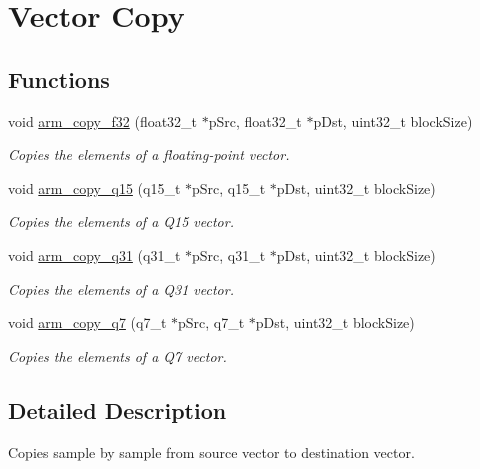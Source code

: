\hypertarget{group__copy}{\section{Vector Copy}
\label{group__copy}
}
\subsection*{Functions}
\begin{DoxyCompactItemize}
\item 
void \hyperlink{group__copy_gadd1f737e677e0e6ca31767c7001417b3}{arm\-\_\-copy\-\_\-f32} (float32\-\_\-t $\ast$p\-Src, float32\-\_\-t $\ast$p\-Dst, uint32\-\_\-t block\-Size)
\begin{DoxyCompactList}\small\item\em Copies the elements of a floating-\/point vector. \end{DoxyCompactList}\item 
void \hyperlink{group__copy_ga872ca4cfc18c680b8991ccd569a5fda0}{arm\-\_\-copy\-\_\-q15} (q15\-\_\-t $\ast$p\-Src, q15\-\_\-t $\ast$p\-Dst, uint32\-\_\-t block\-Size)
\begin{DoxyCompactList}\small\item\em Copies the elements of a Q15 vector. \end{DoxyCompactList}\item 
void \hyperlink{group__copy_gaddf70be7e3f87e535c324862b501f3f9}{arm\-\_\-copy\-\_\-q31} (q31\-\_\-t $\ast$p\-Src, q31\-\_\-t $\ast$p\-Dst, uint32\-\_\-t block\-Size)
\begin{DoxyCompactList}\small\item\em Copies the elements of a Q31 vector. \end{DoxyCompactList}\item 
void \hyperlink{group__copy_ga467579beda492aa92797529d794c88fb}{arm\-\_\-copy\-\_\-q7} (q7\-\_\-t $\ast$p\-Src, q7\-\_\-t $\ast$p\-Dst, uint32\-\_\-t block\-Size)
\begin{DoxyCompactList}\small\item\em Copies the elements of a Q7 vector. \end{DoxyCompactList}\end{DoxyCompactItemize}


\subsection{Detailed Description}
Copies sample by sample from source vector to destination vector.


